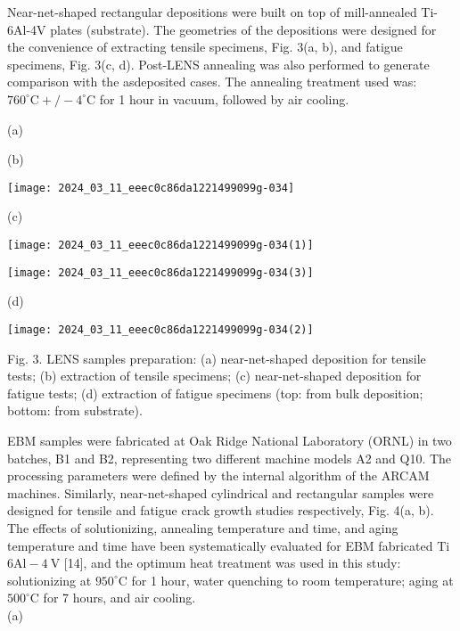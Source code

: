\documentclass[10pt]{article}
\begin{document}
Near-net-shaped rectangular depositions were built on top of mill-annealed Ti-6Al-4V plates (substrate). The geometries of the depositions were designed for the convenience of extracting tensile specimens, Fig. 3(a, b), and fatigue specimens, Fig. 3(c, d). Post-LENS annealing was also performed to generate comparison with the asdeposited cases. The annealing treatment used was: $760^{\circ} \mathrm{C}+/-4^{\circ} \mathrm{C}$ for 1 hour in vacuum, followed by air cooling.

(a)

(b)

\begin{center}
\texttt{[image: 2024\_03\_11\_eeec0c86da1221499099g-034]}
\end{center}

(c)

\begin{center}
\texttt{[image: 2024\_03\_11\_eeec0c86da1221499099g-034(1)]}
\end{center}

\begin{center}
\texttt{[image: 2024\_03\_11\_eeec0c86da1221499099g-034(3)]}
\end{center}

(d)

\begin{center}
\texttt{[image: 2024\_03\_11\_eeec0c86da1221499099g-034(2)]}
\end{center}

Fig. 3. LENS samples preparation: (a) near-net-shaped deposition for tensile tests; (b) extraction of tensile specimens; (c) near-net-shaped deposition for fatigue tests; (d) extraction of fatigue specimens (top: from bulk deposition; bottom: from substrate).

EBM samples were fabricated at Oak Ridge National Laboratory (ORNL) in two batches, B1 and B2, representing two different machine models A2 and Q10. The processing parameters were defined by the internal algorithm of the ARCAM machines. Similarly, near-net-shaped cylindrical and rectangular samples were designed for tensile and fatigue crack growth studies respectively, Fig. 4(a, b). The effects of solutionizing, annealing temperature and time, and aging temperature and time have been systematically evaluated for EBM fabricated Ti$6 \mathrm{Al}-4 \mathrm{~V}$ [14], and the optimum heat treatment was used in this study: solutionizing at $950^{\circ} \mathrm{C}$ for 1 hour, water quenching to room temperature; aging at $500^{\circ} \mathrm{C}$ for 7 hours, and air cooling.\\
(a)
\end{document}
